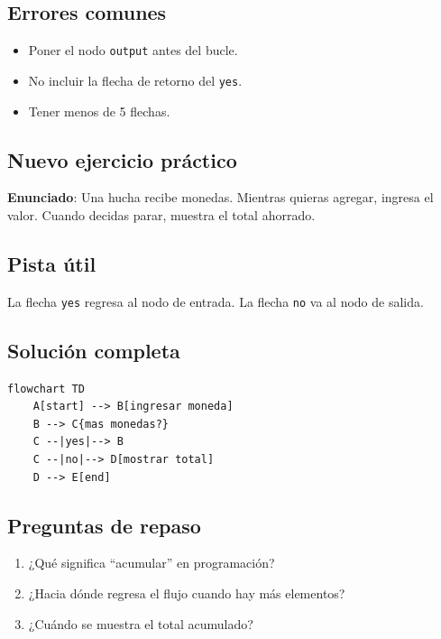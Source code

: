 \documentclass[12pt]{article}
\begin{document}
\subsection{Errores comunes}

\begin{itemize}
    \item Poner el nodo \texttt{output} antes del bucle.
    \item No incluir la flecha de retorno del \texttt{yes}.
    \item Tener menos de 5 flechas.
\end{itemize}

\subsection{Nuevo ejercicio práctico}

\textbf{Enunciado}: Una hucha recibe monedas. Mientras quieras agregar, ingresa el valor. Cuando decidas parar, muestra el total ahorrado.

\subsection{Pista útil}

La flecha \texttt{yes} regresa al nodo de entrada. La flecha \texttt{no} va al nodo de salida.

\subsection{Solución completa}

\begin{lstlisting}[style=mermaidstyle]
flowchart TD
    A[start] --> B[ingresar moneda]
    B --> C{mas monedas?}
    C --|yes|--> B
    C --|no|--> D[mostrar total]
    D --> E[end]
\end{lstlisting}

\subsection{Preguntas de repaso}

\begin{enumerate}
    \item ¿Qué significa ``acumular'' en programación?
    \item ¿Hacia dónde regresa el flujo cuando hay más elementos?
    \item ¿Cuándo se muestra el total acumulado?
\end{enumerate}
\end{document}
